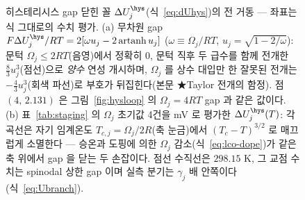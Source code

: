 \begin{figure}[t]
{%
}
\caption{히스테리시스 gap 닫힌 꼴 $\Delta U_j^\hys$(식~\eqref{eq:dUhys})의 전 거동 --- 좌표는 식
그대로의 수치 평가. (a) 무차원 gap $F\Delta U_j^\hys/RT=2[\omega u_j-2\,\mathrm{artanh}\,u_j]$
($\omega\equiv\Omega_j/RT$, $u_j=\sqrt{1-2/\omega}$): 문턱 $\Omega_j\le2RT$(음영)에서 정확히 $0$,
문턱 직후 두 급수를 함께 전개한 $\tfrac83u_j^3$(점선)으로 \emph{양수} 연성 개시하며, $\Omega_j$ 를
상수 대입만 한 잘못된 전개는 $-\tfrac43u_j^3$(회색 파선)로 부호가 뒤집힌다(본문 ★Taylor 전개의 함정).
점 $(4,\,2.131)$ 은 그림~\ref{fig:hysloop} 의 $\Omega_j{=}4RT$ gap 과 같은 값이다.
(b) 표~\ref{tab:staging} 의 $\Omega_j$ 초기값 4건을 mV 로 평가한 $\Delta U_j^\hys(T)$: 각 곡선은
자기 임계온도 $T_{c,j}=\Omega_j/2R$(축 눈금)에서 $(T_c-T)^{3/2}$ 로 매끄럽게 소멸한다 --- 승온과
도핑에 의한 $\Omega_j$ 감소(식~\eqref{eq:lco-dope})가 같은 축 위에서 gap 을 닫는 두 손잡이다.
점선 수직선은 $298.15$ K, 그 교점 수치는 spinodal 상한 gap 이며 실측 분기는 $\gamma_j$ 배 안쪽이다
(식~\eqref{eq:Ubranch}).}
\label{fig:hysgap}
\end{figure}

